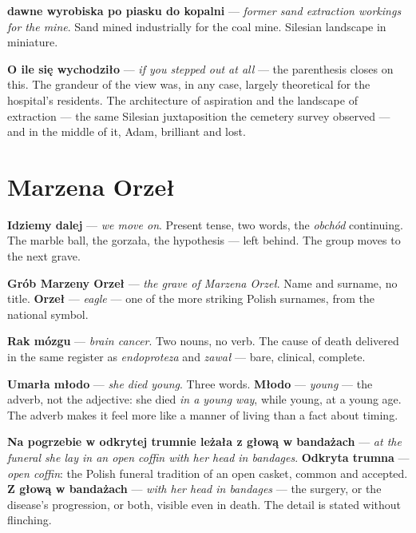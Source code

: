 \textbf{dawne wyrobiska po piasku do kopalni} --- \textit{former sand
extraction workings for the mine}. Sand mined industrially for the
coal mine. Silesian landscape in miniature.

\textbf{O ile się wychodziło} --- \textit{if you stepped out at all}
--- the parenthesis closes on this. The grandeur of the view was, in
any case, largely theoretical for the hospital's residents. The
architecture of aspiration and the landscape of extraction --- the same
Silesian juxtaposition the cemetery survey observed --- and in the
middle of it, Adam, brilliant and lost.

\section{Marzena Orzeł}



\textbf{Idziemy dalej} --- \textit{we move on}. Present tense,
two words, the \textit{obchód} continuing. The marble ball, the
gorzała, the hypothesis --- left behind. The group moves to the
next grave.

\textbf{Grób Marzeny Orzeł} --- \textit{the grave of Marzena
Orzeł}. Name and surname, no title. \textbf{Orzeł} ---
\textit{eagle} --- one of the more striking Polish surnames, from
the national symbol.

\textbf{Rak mózgu} --- \textit{brain cancer}. Two nouns, no
verb. The cause of death delivered in the same register as
\textit{endoproteza} and \textit{zawał} --- bare, clinical,
complete.

\textbf{Umarła młodo} --- \textit{she died young}. Three words.
\textbf{Młodo} --- \textit{young} --- the adverb, not the
adjective: she died \textit{in a young way}, while young, at a
young age. The adverb makes it feel more like a manner of living
than a fact about timing.

\textbf{Na pogrzebie w odkrytej trumnie leżała z głową w
bandażach} --- \textit{at the funeral she lay in an open coffin
with her head in bandages}. \textbf{Odkryta trumna} ---
\textit{open coffin}: the Polish funeral tradition of an open
casket, common and accepted. \textbf{Z głową w bandażach} ---
\textit{with her head in bandages} --- the surgery, or the
disease's progression, or both, visible even in death. The detail
is stated without flinching.

